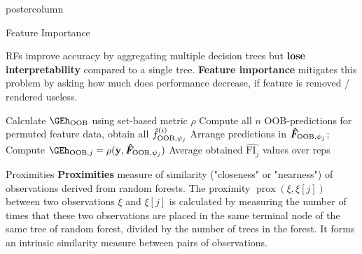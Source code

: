 \documentclass{beamer}
\begin{document}
\begin{frame}[fragile]{}
\begin{columns}
\begin{column}{.31\textwidth}
\begin{beamercolorbox}[center]{postercolumn}
\begin{minipage}{.98\textwidth}
{  \begin{myblock}{Feature Importance}

    RFs improve accuracy by aggregating multiple decision trees but \textbf{lose interpretability} compared to a single tree. 
    \textbf{Feature importance} mitigates this problem by asking how much does performance decrease, if feature is removed / rendered useless.

    \begin{algorithm}[H]
      \small
      \caption{Feature importance based on permutations}
      \begin{algorithmic}[1]
        \State Calculate $\GEh_{\oob}$ using set-based metric $\rho$
          \State Compute all $n$ OOB-predictions for permuted feature data, obtain all $\hat{f}^{(i)}_{\mathrm{OOB},\psi_j}$
          \State Arrange predictions in $\bm{\hat{F}}_{\mathrm{OOB},\psi_j}$;
          Compute $\GEh_{\oob, j} = \rho(\yv, \bm{\hat{F}}_{\oob,\psi_j})$
        \EndFor
        \State Average obtained $\widehat{\text{FI}_j}$ values over reps
        \EndFor
      \end{algorithmic}
      \end{algorithm}

    \begin{algorithm}[H]
      \small
      \caption{Feature importance based on impurity}
      \begin{algorithmic}[1]
        \EndFor
        \EndFor
      \end{algorithmic}
      \end{algorithm}
  \end{myblock}

\begin{myblock}{Proximities}
\textbf{Proximities} measure of similarity ("closeness" or "nearness") of observations derived from random forests.
The proximity $\operatorname{prox}\left(\xi, \xi[j]\right)$ between two observations $\xi$ and $\xi[j]$ is calculated by measuring the number of times that these two observations are placed in the same terminal node of the same tree of random forest, 
divided by the number of trees in the forest.
It forms an intrinsic similarity measure between pairs of observations.


\end{myblock}}
\end{minipage}
\end{beamercolorbox}
\end{column}
\end{columns}
\end{frame}
\end{document}
